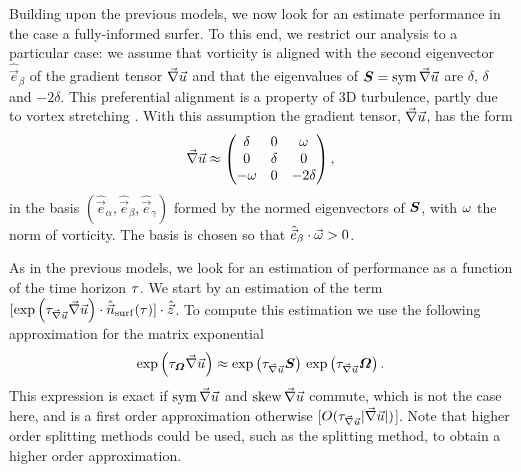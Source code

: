 Building upon the previous models, we now look for an estimate performance in the case a fully-informed surfer.
To this end, we restrict our analysis to a particular case: we assume that vorticity is aligned with the second eigenvector $\hat{\vec{e}}_\beta$ of the gradient tensor $\vec{\nabla} \vec{u}$ and that the eigenvalues of $\boldsymbol{S} = \operatorname{sym} \vec{\nabla} \vec{u}$ are $\delta$, $\delta$ and $-2\delta$.
This preferential alignment is a property of 3D turbulence, partly due to vortex stretching \citep{ashurst1987alignment, tsinober1992experimental, gulitski2007velocity}.
With this assumption the gradient tensor, $\vec{\nabla} \vec{u}$, has the form
\begin{equation}\label{turb:eq:gradient_tensor_model}
	\vec{\nabla} \vec{u} \approx \begin{pmatrix}
		\delta & 0 & \omega\\
		0 & \delta & 0\\
		-\omega & 0 & -2\delta
	\end{pmatrix},
\end{equation}
in the basis $(\hat{\vec{e}}_\alpha, \hat{\vec{e}}_\beta, \hat{\vec{e}}_\gamma)$ formed by the normed eigenvectors of $\boldsymbol{S}$, with $\omega$ the norm of vorticity.
The basis is chosen so that $\hat{\vec{e}}_\beta \cdot \vec{\omega} > 0$.

As in the previous models, we look for an estimation of performance as a function of the time horizon $\tau$.
We start by an estimation of the term $[ \exp \left( \tau_{\vec{\nabla} \vec{u}} \vec{\nabla} \vec{u} \right) \cdot \hat{\vec{n}}_{\mathrm{surf}}(\tau)] \cdot \hat{\vec{z}}$.
To compute this estimation  we use the following approximation for the matrix exponential
\begin{equation}\label{turb:eq:splitting}
	\exp \left( \tau_{\boldsymbol{\varOmega}} \vec{\nabla} \vec{u} \right) \approx \exp \left( \tau_{\vec{\nabla} \vec{u}} \boldsymbol{S} \right) \, \exp \left( \tau_{\vec{\nabla} \vec{u}} \boldsymbol{\varOmega} \right).
\end{equation}
This expression is exact if $\operatorname{sym} \vec{\nabla} \vec{u}$ and $\operatorname{skew} \vec{\nabla} \vec{u}$ commute, which is not the case here, and is a first order approximation otherwise [$O(\tau_{\vec{\nabla} \vec{u}} \lvert \vec{\nabla} \vec{u}\rvert)$].
Note that higher order splitting methods could be used, such as the \citet{strang1968construction} splitting method, to obtain a higher order approximation.

